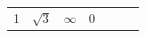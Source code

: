 {\begin{tabular}[t]{|l|l|l|l|l|l|l|}
        1 &
                  $\sqrt{3}$
                 &
                  $\infty $
                 &
        0%
     \tabularnewline\cline{1-1}\cline{2-2}\cline{3-3}\cline{4-4}\cline{5-5}\cline{6-6}\cline{7-7}
    \end{tabular}} %

